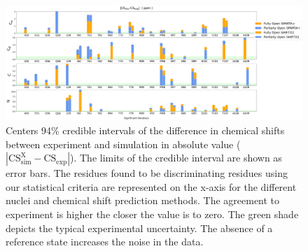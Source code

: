 \documentclass[%
 aip,
 amsmath,amssymb,
 preprint,%
]{revtex4-1}
\begin{document}
\begin{figure}[tbp]
	\includegraphics[width=\textwidth]{figures_SI/assignment_skew_model_markers_no_refernce_print.png}
	 \caption{\scriptsize
Centers 94\% credible intervals of the difference in chemical shifts between experiment and simulation in absolute value ($|\text{CS}_{\text{sim}}^{\text{X}}-\text{CS}_{\text{exp}}|$). The limits of the credible interval are shown as error bars. The residues found to be discriminating residues using our statistical criteria are represented on the x-axis for the different nuclei and chemical shift prediction methods. The agreement to experiment is higher the closer the value is to zero. The green shade depicts the typical experimental uncertainty. The absence of a reference state increases the noise in the data. 
}
\label{SI_assignment_no_ref}
\end{figure}
\end{document}
